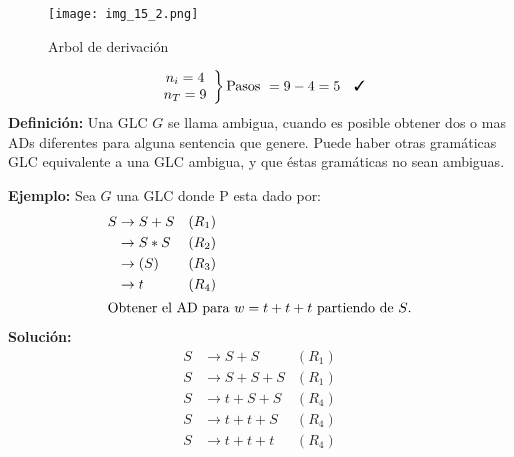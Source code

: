 \begin{figure}[h!]
\centering
\texttt{[image: img\_15\_2.png]}
\caption{Arbol de derivación}\label{img_15_2}
\end{figure}
\begin{align*}
\left. \begin{array}{c}
n_i=4	\\
n_T=9
\end{array}\right \} \mbox{Pasos }=9-4=5 \quad \cmark
\end{align*}
\textbf{Definición: }Una GLC $G$ se llama ambigua, cuando es posible obtener dos o mas ADs diferentes para alguna sentencia que genere. Puede haber otras gramáticas GLC equivalente a una GLC ambigua, y que éstas gramáticas no sean ambiguas.

\textbf{Ejemplo: }Sea $G$ una GLC donde P esta dado por:
\begin{align*}
S	&\rightarrow S+S	&(R_1)	\\
	&\rightarrow S*S	&(R_2)	\\
	&\rightarrow (S)	&(R_3)	\\
	&\rightarrow t		&(R_4)	\\
\intertext{Obtener el AD para $w=t+t+t$ partiendo de $S$.}
\end{align*}
\textbf{Solución: }
\begin{align*}
S	&\rightarrow S+S	&(R_1)	\\
S	&\rightarrow S+S+S	&(R_1)	\\
S	&\rightarrow t+S+S	&(R_4)	\\
S	&\rightarrow t+t+S	&(R_4)	\\
S	&\rightarrow t+t+t	&(R_4)
\end{align*}
